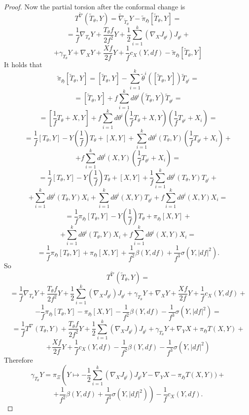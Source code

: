 \documentclass[10pt,a4paper]{amsart}
\newcommand{\g}[1]{\mathfrak{#1}}
\begin{document}
\begin{proof}
 Now the partial torsion after the conformal change is
 $$T^{\widetilde{\nabla}}(\widetilde{T}_{\theta},Y) = \widetilde{\nabla}_{\widetilde{T}_{\theta}}Y - \widetilde{\pi}_{\g{H}}[\widetilde{T}_{\theta},Y] =$$
 $$= \frac{1}{f}\nabla_{T_{\theta}}Y + \frac{T_{\theta}f}{2f^2}Y + \frac{1}{2}\sum_{i=1}^k(\nabla_XJ_{\theta^i})J_{\theta^i}+$$
 $$+\gamma_{T_{\theta}}Y + \nabla_XY + \frac{Xf}{2f}Y + \frac{1}{f}c_X(Y,df) - \widetilde{\pi}_{\g{H}}[\widetilde{T}_{\theta},Y] $$
 It holds that
 $$\widetilde{\pi}_{\g{H}}[\widetilde{T}_{\theta},Y] = [\widetilde{T}_{\theta},Y] - \sum_{i=1}^k\widetilde{\theta}^i([\widetilde{T}_{\theta},Y])\widetilde{T}_{\theta^i} =$$
 $$= [\widetilde{T}_{\theta},Y] + f\sum_{i=1}^kd\theta^i(\widetilde{T}_{\theta},Y)\widetilde{T}_{\theta^i} =$$
 $$= [\frac{1}{f}T_{\theta}+X,Y] + f\sum_{i=1}^kd\theta^i(\frac{1}{f}T_{\theta}+X,Y)\left(\frac{1}{f}T_{\theta^i} + X_i \right)=$$
 $$= \frac{1}{f}[T_{\theta},Y] - Y\left(\frac{1}{f}\right)T_{\theta} + [X,Y] + \sum_{i=1}^kd\theta^i(T_{\theta},Y)\left(\frac{1}{f}T_{\theta^i}+ X_i \right)+$$
 $$ + f\sum_{i=1}^kd\theta^i(X,Y)\left(\frac{1}{f}T_{\theta^i} + X_i \right) =$$
 $$= \frac{1}{f}[T_{\theta},Y] - Y\left(\frac{1}{f}\right)T_{\theta} + [X,Y] + \frac{1}{f}\sum_{i=1}^kd\theta^i(T_{\theta},Y)T_{\theta^i} +$$
 $$+ \sum_{i=1}^kd\theta^i(T_{\theta},Y)X_i + \sum_{i=1}^kd\theta^i(X,Y)T_{\theta^i}+ f\sum_{i=1}^kd\theta^i(X,Y)X_i=$$
 $$= \frac{1}{f}\pi_{\g{H}}[T_{\theta},Y] - Y\left(\frac{1}{f}\right)T_{\theta} + \pi_{\g{H}}[X,Y] +$$
 $$+ \sum_{i=1}^kd\theta^i(T_{\theta},Y)X_i + f\sum_{i=1}^kd\theta^i(X,Y)X_i=$$
 $$= \frac{1}{f}\pi_{\g{H}}[T_{\theta},Y] + \pi_{\g{H}}[X,Y] + \frac{1}{f^2}\beta(Y,df) + \frac{1}{f^3}\sigma(Y,|df|^2).$$
 So
 $$T^{\widetilde{\nabla}}(\widetilde{T}_{\theta},Y) =$$
 $$= \frac{1}{f}\nabla_{T_{\theta}}Y + \frac{T_{\theta}f}{2f^2}Y + \frac{1}{2}\sum_{i=1}^k(\nabla_XJ_{\theta^i})J_{\theta^i}+\gamma_{T_{\theta}}Y + \nabla_XY + \frac{Xf}{2f}Y + \frac{1}{f}c_X(Y,df)+$$
 $$ - \frac{1}{f}\pi_{\g{H}}[T_{\theta},Y] - \pi_{\g{H}}[X,Y] - \frac{1}{f^2}\beta(Y,df) -\frac{1}{f^3}\sigma(Y,|df|^2) =$$
 $$= \frac{1}{f}T^{\nabla}(T_{\theta},Y) + \frac{T_{\theta}f}{2f^2}Y + \frac{1}{2}\sum_{i=1}^k(\nabla_XJ_{\theta^i})J_{\theta^i}+\gamma_{T_{\theta}}Y + \nabla_YX +\pi_{\g{H}}T(X,Y) +$$
 $$+ \frac{Xf}{2f}Y + \frac{1}{f}c_X(Y,df) - \frac{1}{f^2}\beta(Y,df) -\frac{1}{f^3}\sigma(Y,|df|^2)$$
 Therefore
 $$\gamma_{T_{\theta}}Y =\pi_{\Xi}\left(Y\mapsto -\frac{1}{2}\sum_{i=1}^k(\nabla_XJ_{\theta^i})J_{\theta^i}Y - \nabla_YX - \pi_{\g{H}}T(X,Y))+\right.$$
 $$\left. +\frac{1}{f^2}\beta(Y,df) +\frac{1}{f^3}\sigma(Y,|df|^2) \right)-\frac{1}{f}c_X(Y,df).$$
\end{proof}
\end{document}
